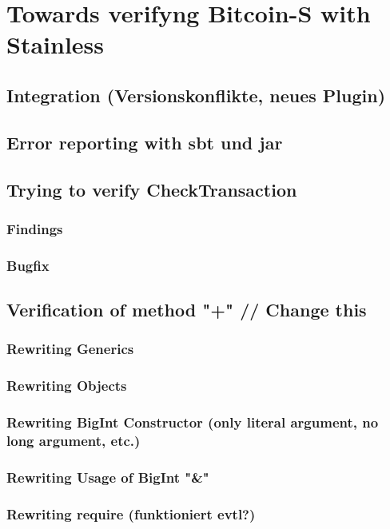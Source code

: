 \chapter{Towards verifyng Bitcoin-S with Stainless}
\label{chap:connecting}

\section{Integration (Versionskonflikte, neues Plugin)}


\section{Error reporting with sbt und jar}


\section{Trying to verify CheckTransaction}

\subsection{Findings}

\subsection{Bugfix}


\section{Verification of method "+" // Change this}

\subsection{Rewriting Generics}

\subsection{Rewriting Objects}

\subsection{Rewriting BigInt Constructor (only literal argument, no long argument, etc.)}

\subsection{Rewriting Usage of BigInt "\&"}

\subsection{Rewriting require (funktioniert evtl?)}
